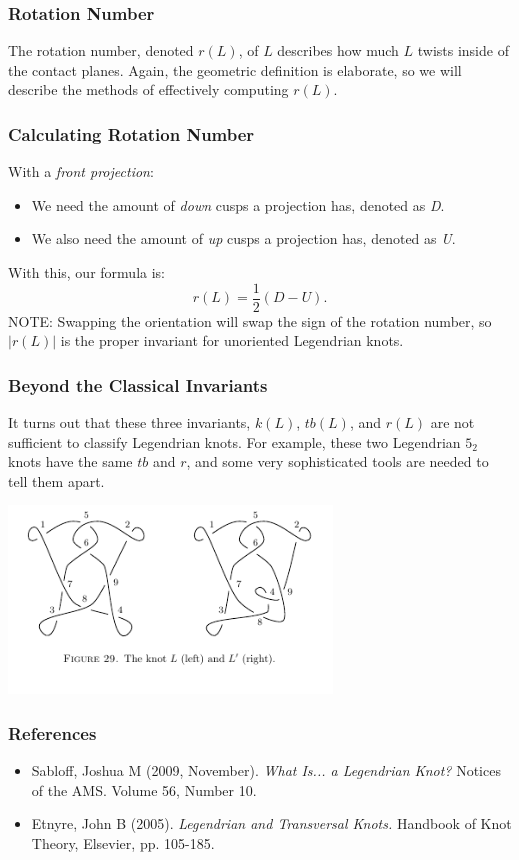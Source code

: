 \documentclass{beamer}
\begin{document}
\begin{frame}
    \frametitle{Rotation Number}
    The \alert{rotation number}, denoted \alert{$r(L)$}, of $L$ describes how
    much $L$ twists inside of the contact planes.
    Again, the geometric definition is elaborate, so we will describe the
    methods of effectively computing $r(L)$.
\end{frame}


\begin{frame}
    \frametitle{Calculating Rotation Number}
    With a \textit{front projection}:
    \begin{itemize}
        \item{We need the amount of \textit{down} cusps a projection has, denoted
        as \textit{D}.}
      \item{We also need the amount of \textit{up} cusps a projection has,
      denoted as \textit{U}.}
    \end{itemize}
    With this, our formula is:
    \[r(L) = \frac{1}{2}(D - U).\]
    \alert{NOTE}: Swapping the orientation will swap the sign of the rotation number,
    so $|r(L)|$ is the proper invariant for unoriented Legendrian knots.
\end{frame}

\begin{frame}
    \frametitle{Beyond the Classical Invariants}
    It turns out that these three invariants, $k(L)$, $tb(L)$, and $r(L)$
    are not sufficient to classify Legendrian knots. For example, these
    two Legendrian $5_2$ knots have the same $tb$ and $r$, and some very
    sophisticated tools are needed to tell them apart.

    \begin{center}
    \includegraphics[height=5cm]{diffKnots.jpg}
    \end{center}
\end{frame}
\begin{frame}
    \frametitle{References}
    \begin{itemize}
        \item Sabloff, Joshua M (2009, November). \textit{What Is... a Legendrian Knot?}
        Notices of the AMS. Volume 56, Number 10.
    \end{itemize}
    \begin{itemize}
        \item Etnyre, John B (2005). \textit{Legendrian and Transversal Knots.}
        Handbook of Knot Theory, Elsevier, pp. 105-185.
    \end{itemize}

\end{frame}
\end{document}
